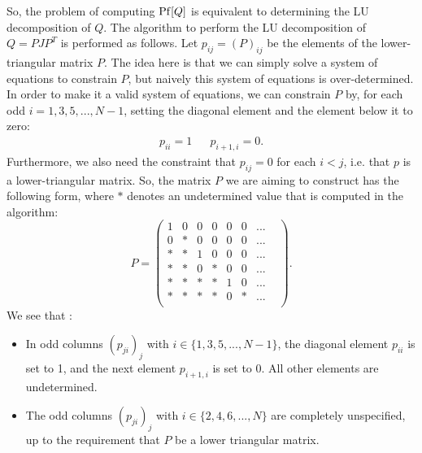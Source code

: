 So, the problem of computing $\mathrm{Pf}[Q]$ is equivalent to determining the LU decomposition of $Q$. The algorithm to perform the LU decomposition of $Q = P J P^T$ is performed as follows. Let $p_{ij} = (P)_{ij}$ be the elements of the lower-triangular matrix $P$. The idea here is that we can simply solve a system of equations to constrain $P$, but naively this system of equations is over-determined. In order to make it a valid system of equations, we can constrain $P$ by, for each odd $i = 1, 3, 5, ..., N - 1$, setting the diagonal element and the element below it to zero:
\begin{align}
	p_{ii} = 1 && p_{i+1, i} = 0.
\end{align}
Furthermore, we also need the constraint that $p_{ij} = 0$ for each $i < j$, i.e. that $p$ is a lower-triangular matrix. So, the matrix $P$ we are aiming to construct has the following form, where $*$ denotes an undetermined value that is computed in the algorithm:
\begin{equation}
	P = \begin{pmatrix} 
		1 & 0 & 0 & 0 & 0 & 0 & ... & \\
		0 & * & 0 & 0 & 0 & 0 & ... & \\
		* & * & 1 & 0 & 0 & 0 & ... & \\
		* & * & 0 & * & 0 & 0 & ... & \\
		* & * & * & * & 1 & 0 & ... & \\
		* & * & * & * & 0 & * & ... & \\
	\end{pmatrix}.
\end{equation}
We see that :
\begin{itemize}
	\item In odd columns $(p_{ji})_j$ with $i\in \{1, 3, 5, ..., N - 1\}$, the diagonal element $p_{ii}$ is set to 1, and the next element $p_{i+1, i}$ is set to 0. All other elements are undetermined.
	\item The odd columns $(p_{ji})_j$ with $i\in \{2, 4, 6, ..., N\}$ are completely unspecified, up to the requirement that $P$ be a lower triangular matrix. 
\end{itemize}

